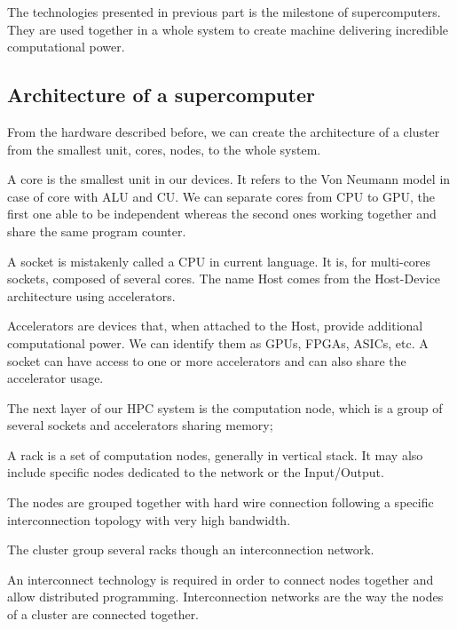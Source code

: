 The technologies presented in previous part is the milestone of supercomputers. 
They are used together in a whole system to create machine delivering incredible computational power.

\subsection{Architecture of a supercomputer}
From the hardware described before, we can create the architecture of a cluster from the smallest unit, cores, nodes, to the whole system.

\begin{description}
\item[Core:] A core is the smallest unit in our devices. 
It refers to the Von Neumann model in case of core with ALU and CU. 
We can separate cores from CPU to GPU, the first one able to be independent whereas the second ones working together and share the same program counter. 
\item[Socket/Host:] A socket is mistakenly called a CPU in current language. 
It is, for multi-cores sockets, composed of several cores. 
The name Host comes from the Host-Device architecture using accelerators. 
\item[Accelerators/Devices:] Accelerators are devices that, when attached to the Host, provide additional computational power. 
We can identify them as GPUs, FPGAs, ASICs, etc. 
A socket can have access to one or more accelerators and can also share the accelerator usage. 
\item[Computation node: ] The next layer of our HPC system is the computation node, which is a group of several sockets and accelerators sharing memory;
\item[Rack: ] A rack is a set of computation nodes, generally in vertical stack. 
It may also include specific nodes dedicated to the network or the Input/Output.
\item[Interconnection: ] The nodes are grouped together with hard wire connection following a specific interconnection topology with very high bandwidth.
\item[System/Cluster/Supercomputer] The cluster group several racks though an interconnection network.
\end{description}

An interconnect technology is required in order to connect nodes together and allow distributed programming. 
Interconnection networks are the way the nodes of a cluster are connected together. 

